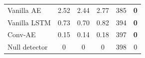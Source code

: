 \begin{table}[H]
\begin{tabular}{l *3{S[table-format=3.2]} *2{S[table-format=3.0]}}
        Vanilla AE                   & 2.52           & 2.44           & 2.77           & 385          & \textbf{0} \\
        Vanilla LSTM                 & 0.73           & 0.70           & 0.82           & 394          & \textbf{0} \\
        Conv-AE                      & 0.15           & 0.14           & 0.18           & 397          & \textbf{0} \\
        \midrule
        Null detector                & 0              & 0              & 0              & 398          & 0          \\
        \bottomrule
    \end{tabular}
\end{table}
